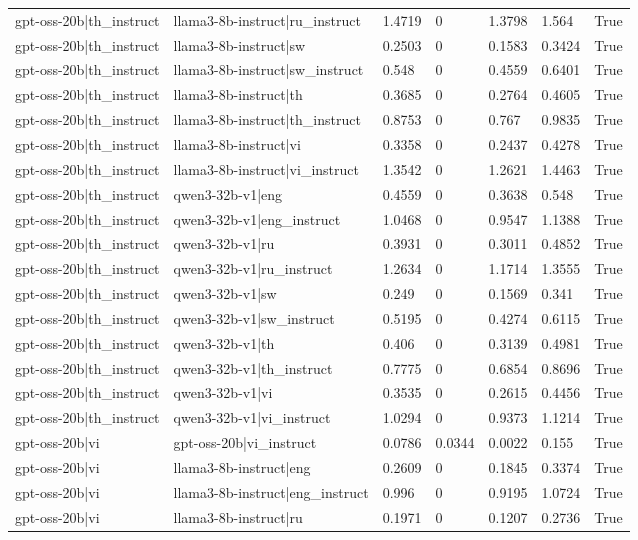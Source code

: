 \begin{table}
\begin{tabular}{llllllr}
gpt-oss-20b|th_instruct & llama3-8b-instruct|ru_instruct & 1.4719 & 0 & 1.3798 & 1.564 & True \\
gpt-oss-20b|th_instruct & llama3-8b-instruct|sw & 0.2503 & 0 & 0.1583 & 0.3424 & True \\
gpt-oss-20b|th_instruct & llama3-8b-instruct|sw_instruct & 0.548 & 0 & 0.4559 & 0.6401 & True \\
gpt-oss-20b|th_instruct & llama3-8b-instruct|th & 0.3685 & 0 & 0.2764 & 0.4605 & True \\
gpt-oss-20b|th_instruct & llama3-8b-instruct|th_instruct & 0.8753 & 0 & 0.767 & 0.9835 & True \\
gpt-oss-20b|th_instruct & llama3-8b-instruct|vi & 0.3358 & 0 & 0.2437 & 0.4278 & True \\
gpt-oss-20b|th_instruct & llama3-8b-instruct|vi_instruct & 1.3542 & 0 & 1.2621 & 1.4463 & True \\
gpt-oss-20b|th_instruct & qwen3-32b-v1|eng & 0.4559 & 0 & 0.3638 & 0.548 & True \\
gpt-oss-20b|th_instruct & qwen3-32b-v1|eng_instruct & 1.0468 & 0 & 0.9547 & 1.1388 & True \\
gpt-oss-20b|th_instruct & qwen3-32b-v1|ru & 0.3931 & 0 & 0.3011 & 0.4852 & True \\
gpt-oss-20b|th_instruct & qwen3-32b-v1|ru_instruct & 1.2634 & 0 & 1.1714 & 1.3555 & True \\
gpt-oss-20b|th_instruct & qwen3-32b-v1|sw & 0.249 & 0 & 0.1569 & 0.341 & True \\
gpt-oss-20b|th_instruct & qwen3-32b-v1|sw_instruct & 0.5195 & 0 & 0.4274 & 0.6115 & True \\
gpt-oss-20b|th_instruct & qwen3-32b-v1|th & 0.406 & 0 & 0.3139 & 0.4981 & True \\
gpt-oss-20b|th_instruct & qwen3-32b-v1|th_instruct & 0.7775 & 0 & 0.6854 & 0.8696 & True \\
gpt-oss-20b|th_instruct & qwen3-32b-v1|vi & 0.3535 & 0 & 0.2615 & 0.4456 & True \\
gpt-oss-20b|th_instruct & qwen3-32b-v1|vi_instruct & 1.0294 & 0 & 0.9373 & 1.1214 & True \\
gpt-oss-20b|vi & gpt-oss-20b|vi_instruct & 0.0786 & 0.0344 & 0.0022 & 0.155 & True \\
gpt-oss-20b|vi & llama3-8b-instruct|eng & 0.2609 & 0 & 0.1845 & 0.3374 & True \\
gpt-oss-20b|vi & llama3-8b-instruct|eng_instruct & 0.996 & 0 & 0.9195 & 1.0724 & True \\
gpt-oss-20b|vi & llama3-8b-instruct|ru & 0.1971 & 0 & 0.1207 & 0.2736 & True \\

\end{tabular}
\end{table}
